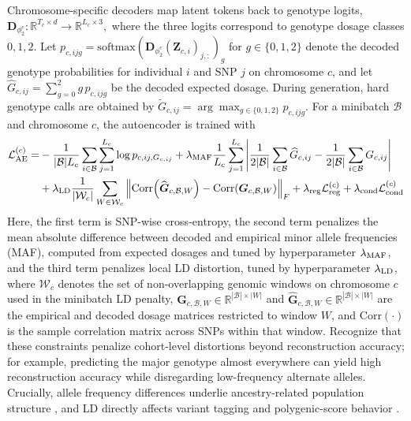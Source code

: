 \documentclass{article}
\begin{document}
Chromosome-specific decoders map latent tokens back to genotype logits, \(
\mathbf{D}_{\phi_2^c}:\mathbb R^{T_c\times d}\rightarrow \mathbb R^{L_c\times 3},\)
where the three logits correspond to genotype dosage classes \(0,1,2\). Let
\(
p_{c,ijg}
=
\mathrm{softmax}(\mathbf{D}_{\phi_2^c}(\boldsymbol{Z}_{c,i})_{j,:})_g
\)
for \(g\in\{0,1,2\}\) denote the decoded genotype probabilities for individual \(i\) and SNP \(j\) on chromosome \(c\), and let
\(
\widehat G_{c,ij}=\sum_{g=0}^{2} g\,p_{c,ijg}
\)
be the decoded expected dosage. During generation, hard genotype calls are obtained by
\(
\widetilde G_{c,ij}=\arg\max_{g\in\{0,1,2\}}p_{c,ijg}.
\)
For a minibatch \(\mathcal B\) and chromosome \(c\), the autoencoder is trained with
\[
\begin{aligned}
\mathcal L_{\mathrm{AE}}^{(c)}
=&
-\frac{1}{|\mathcal B|L_c}
\sum_{i\in\mathcal B}
\sum_{j=1}^{L_c}
\log p_{c,ij,G_{c,ij}}
+
\lambda_{\mathrm{MAF}}
\frac{1}{L_c}
\sum_{j=1}^{L_c}
\left|
\frac{1}{2|\mathcal B|}
\sum_{i\in\mathcal B}
\widehat G_{c,ij}
-
\frac{1}{2|\mathcal B|}
\sum_{i\in\mathcal B}
G_{c,ij}
\right|
\\
&+
\lambda_{\mathrm{LD}}
\frac{1}{|\mathcal W_c|}
\sum_{W\in\mathcal W_c}
\left\|
\mathrm{Corr}\!\left(\widehat{\boldsymbol{G}}_{c,\mathcal B,W}\right)
-
\mathrm{Corr}\!\left(\boldsymbol{G}_{c,\mathcal B,W}\right)
\right\|_F
+
\lambda_{\rm reg}\mathcal L_{\mathrm{reg}}^{(c)} 
+ 
\lambda_{\mathrm{cond}}\mathcal L_{\mathrm{cond}}^{(c)} 
\end{aligned}
\]
Here, the first term is SNP-wise cross-entropy, the second term penalizes the mean absolute difference between decoded and empirical minor allele frequencies (MAF), computed from expected dosages and tuned by hyperparameter $\lambda_{\rm MAF}$, and the third term penalizes local LD distortion, tuned by hyperparameter $\lambda_{\rm LD}$, where \(\mathcal W_c\) denotes the set of non-overlapping genomic windows on chromosome \(c\) used in the minibatch LD penalty, \(\boldsymbol{G}_{c,\mathcal B,W}\in\mathbb R^{|\mathcal B|\times |W|}\) and \(\widehat{\boldsymbol{G}}_{c,\mathcal B,W}\in\mathbb R^{|\mathcal B|\times |W|}\) are the empirical and decoded dosage matrices restricted to window \(W\), and \(\mathrm{Corr}(\cdot)\) is the sample correlation matrix across SNPs within that window. Recognize that these constraints penalize cohort-level distortions beyond reconstruction accuracy; for example, predicting the major genotype almost everywhere can yield high reconstruction accuracy while disregarding low-frequency alternate alleles. Crucially, allele frequency differences underlie ancestry-related population structure \cite{patterson2006population, price2006principal}, and LD directly affects variant tagging and polygenic-score behavior \cite{wray2005allele, vilhjalmsson2015modeling}. 
\end{document}
